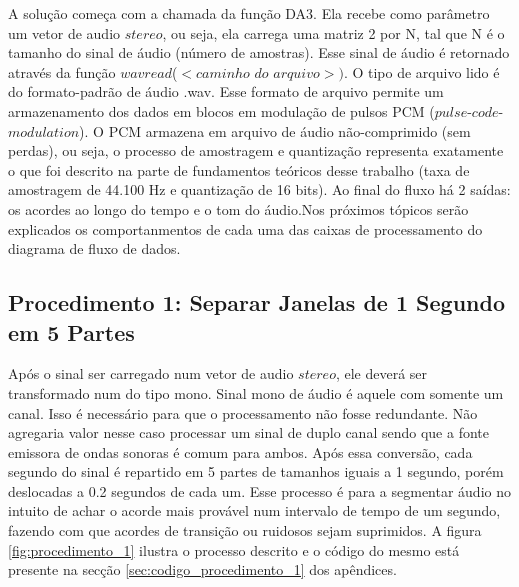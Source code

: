 A solução começa com a chamada da função DA3. Ela recebe como parâmetro um vetor de audio $stereo$, ou seja, ela carrega uma matriz 2 por N, tal que N é o tamanho do sinal de áudio (número de amostras). Esse sinal de áudio é retornado através da função $wavread$($<$$caminho$ $do$ $arquivo$$>$$)$. O tipo de arquivo lido é do formato-padrão de áudio .wav. Esse formato de arquivo permite um armazenamento dos dados em blocos em modulação de pulsos PCM ($pulse$-$code$-$modulation$). O PCM armazena em arquivo de áudio não-comprimido (sem perdas), ou seja, o processo de amostragem e quantização representa exatamente o que foi descrito na parte de fundamentos teóricos desse trabalho (taxa de amostragem de 44.100 Hz e quantização de 16 bits). Ao final do fluxo há 2 saídas: os acordes ao longo do tempo e o tom do áudio.Nos próximos tópicos serão explicados os comportanmentos de cada uma das caixas de processamento do diagrama de fluxo de dados.

\subsection{Procedimento 1: Separar Janelas de 1 Segundo em 5 Partes}
\label{subsec:procedimento_1}

Após o sinal ser carregado num vetor de audio $stereo$, ele deverá ser transformado num do tipo mono. Sinal mono de áudio é aquele com somente um canal. Isso é necessário para que o processamento não fosse redundante. Não agregaria valor nesse caso processar um sinal de duplo canal sendo que a fonte emissora de ondas sonoras é comum para ambos. Após essa conversão, cada segundo do sinal é repartido em 5 partes de tamanhos iguais a 1 segundo, porém deslocadas a 0.2 segundos de cada um. Esse processo é para a segmentar áudio no intuito de achar o acorde mais provável num intervalo de tempo de um segundo, fazendo com que acordes de transição ou ruidosos sejam suprimidos. A figura \ref{fig:procedimento_1} ilustra o processo descrito e o código do mesmo está presente na secção \ref{sec:codigo_procedimento_1} dos apêndices.

